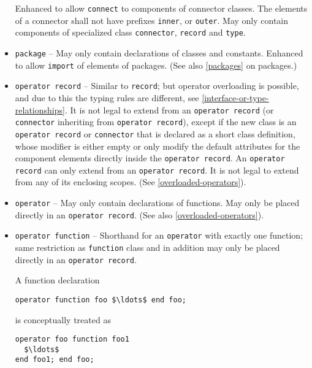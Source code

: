 \begin{itemize}
Enhanced to allow \lstinline!connect! to components of connector classes.  The elements of a connector shall not have prefixes \lstinline!inner!, or \lstinline!outer!.  May only contain components of specialized class \lstinline!connector!, \lstinline!record! and \lstinline!type!.

\item \lstinline!package! --
May only contain declarations of classes and constants.  Enhanced to allow \lstinline!import! of elements of packages.  (See also \cref{packages} on packages.)

\item \lstinline!operator record! --
Similar to \lstinline!record!; but operator overloading is possible, and due to this the typing rules are different, see \cref{interface-or-type-relationships}.  It is not legal to extend from an \lstinline!operator record! (or \lstinline!connector! inheriting from \lstinline!operator record!), except if the new class is an \lstinline!operator record! or \lstinline!connector! that is declared as a short class definition, whose modifier is either empty or only modify the default attributes for the component elements directly inside the \lstinline!operator record!.  An \lstinline!operator record! can only extend from an \lstinline!operator record!.  It is not legal to extend from any of its enclosing scopes.  (See \cref{overloaded-operators}).

\item \lstinline!operator! --
May only contain declarations of functions.
May only be placed directly in an \lstinline!operator record!.  (See also \cref{overloaded-operators}).

\item \lstinline!operator function! --
Shorthand for an \lstinline!operator! with exactly one function; same restriction as \lstinline!function! class and in addition may only be placed directly in an \lstinline!operator record!.
\begin{nonnormative}
A function declaration
\begin{lstlisting}[language=modelica]
operator function foo $\ldots$ end foo;
\end{lstlisting}
is conceptually treated as
\begin{lstlisting}[language=modelica]
operator foo function foo1
  $\ldots$
end foo1; end foo;
\end{lstlisting}
\end{nonnormative}

\end{itemize}

